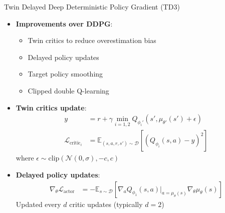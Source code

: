 \documentclass{beamer}
\begin{document}
\begin{frame}{Twin Delayed Deep Deterministic Policy Gradient (TD3)}
\begin{itemize}
    \item \textbf{Improvements over DDPG}:
    \begin{itemize}
        \item Twin critics to reduce overestimation bias
        \item Delayed policy updates
        \item Target policy smoothing
        \item Clipped double Q-learning
    \end{itemize}
    
    \item \textbf{Twin critics update}:
    \begin{align}
    y &= r + \gamma \min_{i=1,2} Q_{\phi_i'}(s', \mu_{\theta'}(s') + \epsilon) \\
    \mathcal{L}_{\text{critic}_i} &= \mathbb{E}_{(s,a,r,s') \sim \mathcal{D}}\left[(Q_{\phi_i}(s,a) - y)^2\right] 
    \end{align}
    where $\epsilon \sim \text{clip}(\mathcal{N}(0, \sigma), -c, c)$
    
    \item \textbf{Delayed policy updates}:
    \begin{align}
    \nabla_\theta \mathcal{L}_{\text{actor}} &= -\mathbb{E}_{s \sim \mathcal{D}}\left[\nabla_a Q_{\phi_1}(s,a)|_{a=\mu_\theta(s)} \nabla_\theta \mu_\theta(s)\right]
    \end{align}
    Updated every $d$ critic updates (typically $d=2$)
\end{itemize}
\end{frame}
\end{document}
